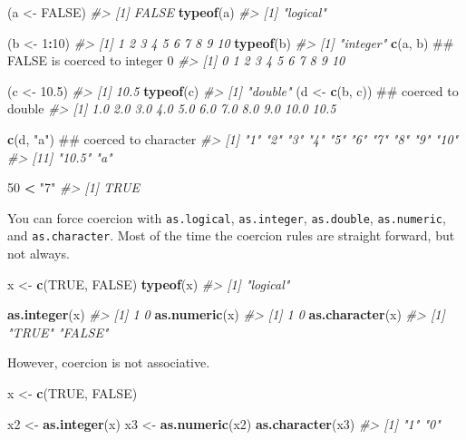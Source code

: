 \documentclass[]{book}
\newenvironment{Shaded}{\begin{snugshade}}{\end{snugshade}}
\newcommand{\CommentTok}[1]{\textcolor[rgb]{0.56,0.35,0.01}{\textit{#1}}}
\newcommand{\DecValTok}[1]{\textcolor[rgb]{0.00,0.00,0.81}{#1}}
\newcommand{\FloatTok}[1]{\textcolor[rgb]{0.00,0.00,0.81}{#1}}
\newcommand{\KeywordTok}[1]{\textcolor[rgb]{0.13,0.29,0.53}{\textbf{#1}}}
\newcommand{\NormalTok}[1]{#1}
\newcommand{\OperatorTok}[1]{\textcolor[rgb]{0.81,0.36,0.00}{\textbf{#1}}}
\newcommand{\OtherTok}[1]{\textcolor[rgb]{0.56,0.35,0.01}{#1}}
\newcommand{\StringTok}[1]{\textcolor[rgb]{0.31,0.60,0.02}{#1}}
\theoremstyle{definition}
\theoremstyle{definition}
\theoremstyle{definition}
\theoremstyle{remark}
\begin{document}
\begin{Shaded}
\begin{Highlighting}[]
\NormalTok{(a <-}\StringTok{ }\OtherTok{FALSE}\NormalTok{)}
\CommentTok{#> [1] FALSE}
\KeywordTok{typeof}\NormalTok{(a)}
\CommentTok{#> [1] "logical"}

\NormalTok{(b <-}\StringTok{ }\DecValTok{1}\OperatorTok{:}\DecValTok{10}\NormalTok{)}
\CommentTok{#>  [1]  1  2  3  4  5  6  7  8  9 10}
\KeywordTok{typeof}\NormalTok{(b)}
\CommentTok{#> [1] "integer"}
\KeywordTok{c}\NormalTok{(a, b)         ## FALSE is coerced to integer 0}
\CommentTok{#>  [1]  0  1  2  3  4  5  6  7  8  9 10}

\NormalTok{(c <-}\StringTok{ }\FloatTok{10.5}\NormalTok{)}
\CommentTok{#> [1] 10.5}
\KeywordTok{typeof}\NormalTok{(c)}
\CommentTok{#> [1] "double"}
\NormalTok{(d <-}\StringTok{ }\KeywordTok{c}\NormalTok{(b, c))  ## coerced to double}
\CommentTok{#>  [1]  1.0  2.0  3.0  4.0  5.0  6.0  7.0  8.0  9.0 10.0 10.5}

\KeywordTok{c}\NormalTok{(d, }\StringTok{"a"}\NormalTok{)       ## coerced to character}
\CommentTok{#>  [1] "1"    "2"    "3"    "4"    "5"    "6"    "7"    "8"    "9"    "10"  }
\CommentTok{#> [11] "10.5" "a"}

\DecValTok{50} \OperatorTok{<}\StringTok{ "7"}
\CommentTok{#> [1] TRUE}
\end{Highlighting}
\end{Shaded}

You can force coercion with \texttt{as.logical}, \texttt{as.integer},
\texttt{as.double}, \texttt{as.numeric}, and \texttt{as.character}. Most
of the time the coercion rules are straight forward, but not always.

\begin{Shaded}
\begin{Highlighting}[]
\NormalTok{x <-}\StringTok{ }\KeywordTok{c}\NormalTok{(}\OtherTok{TRUE}\NormalTok{, }\OtherTok{FALSE}\NormalTok{)}
\KeywordTok{typeof}\NormalTok{(x)}
\CommentTok{#> [1] "logical"}

\KeywordTok{as.integer}\NormalTok{(x)}
\CommentTok{#> [1] 1 0}
\KeywordTok{as.numeric}\NormalTok{(x)}
\CommentTok{#> [1] 1 0}
\KeywordTok{as.character}\NormalTok{(x)}
\CommentTok{#> [1] "TRUE"  "FALSE"}
\end{Highlighting}
\end{Shaded}

However, coercion is not associative.

\begin{Shaded}
\begin{Highlighting}[]
\NormalTok{x <-}\StringTok{ }\KeywordTok{c}\NormalTok{(}\OtherTok{TRUE}\NormalTok{, }\OtherTok{FALSE}\NormalTok{)}

\NormalTok{x2 <-}\StringTok{ }\KeywordTok{as.integer}\NormalTok{(x)}
\NormalTok{x3 <-}\StringTok{ }\KeywordTok{as.numeric}\NormalTok{(x2)}
\KeywordTok{as.character}\NormalTok{(x3)}
\CommentTok{#> [1] "1" "0"}
\end{Highlighting}
\end{Shaded}
\end{document}
